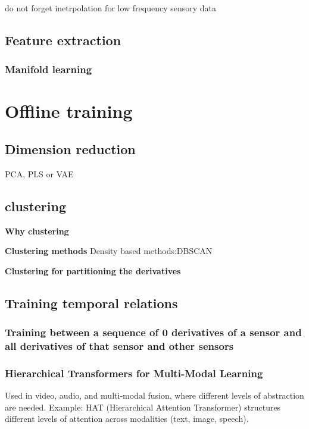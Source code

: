      do not forget inetrpolation for low frequency sensory data

    \subsection{Feature extraction}
        \subsubsection{Manifold learning}

\section{Offline training}
    \subsection{Dimension reduction} PCA, PLS or VAE
    \subsection{clustering}
        \textbf{Why clustering}

        \textbf{Clustering methods} Density based methods:DBSCAN
            
        
        
        \textbf{Clustering for partitioning the derivatives}

    \subsection{Training temporal relations}
        \subsubsection{Training between a sequence of 0 derivatives of a sensor and all derivatives of that sensor and other sensors}
        \subsubsection{Hierarchical Transformers for Multi-Modal Learning}
            Used in video, audio, and multi-modal fusion, where different levels of abstraction are needed.
            Example: HAT (Hierarchical Attention Transformer) structures different levels of attention across modalities (text, image, speech).
        

